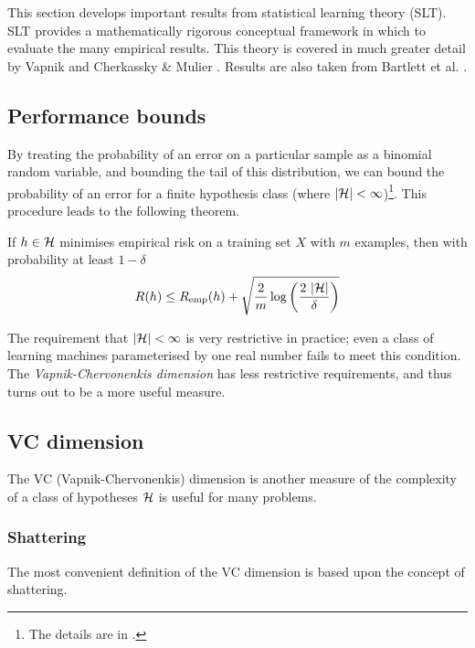 This section develops important results from statistical learning
theory (SLT).  SLT provides a mathematically rigorous
conceptual framework in which to evaluate the many empirical results.
This theory is covered in much greater detail by Vapnik
\cite{Vapnik98} and Cherkassky \& Mulier \cite{Cherkassky98}.  Results
are also taken from Bartlett et al. \cite{Bartlett98a}.

\subsection{Performance bounds}

By treating the probability of an error on a particular sample as a
binomial random variable, and bounding the tail of this distribution,
we can bound the probability of an error for a finite hypothesis class
(where $|\mathcal{H}| < \infty$)\footnote{The details are in
\cite{Bartlett99b}.}.  This procedure leads to the following theorem.

\begin{theorem}
If $h \in \mathcal{H}$ minimises empirical risk on a training set $X$
with $m$ examples, then with probability at least $1 - \delta$
%
\begin{equation}
R(h) \leq R_{\mathrm{emp}}(h) + \sqrt{\frac{2}{m}
\log \left( \frac{2\  |\mathcal{H}|}{\delta} \right)}
\end{equation}
\end{theorem}

The requirement that $|\mathcal{H}| < \infty$ is very restrictive in
practice; even a class of learning machines parameterised by one real
number fails to meet this condition.  The \emph{Vapnik-Chervonenkis
dimension} has less restrictive requirements, and thus turns out to be
a more useful measure.


\subsection{VC dimension}
\label{acr:vcdim}
\label{sec:vcdim}

The VC (Vapnik-Chervonenkis) dimension is another measure of the complexity
of a class of hypotheses $\mathcal{H}$ is useful for many problems.

\subsubsection{Shattering}

The most convenient definition of the VC dimension is based upon the
concept of shattering.

